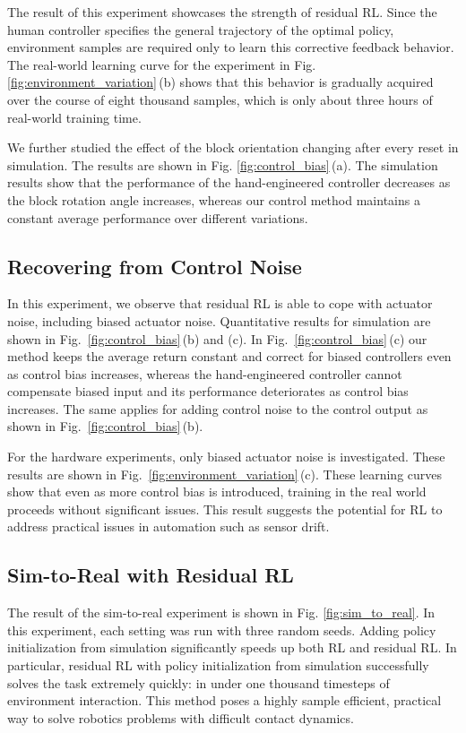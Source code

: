 The result of this experiment showcases the strength of residual RL. Since the human controller specifies the general trajectory of the optimal policy, environment samples are required only to learn this corrective feedback behavior. The real-world learning curve for the experiment in Fig. \ref{fig:environment_variation}\,(b) shows that this behavior is gradually acquired over the course of eight thousand samples, which is only about three hours of real-world training time.

We further studied the effect of the block orientation changing after every reset in simulation. The results are shown in Fig. \ref{fig:control_bias}\,(a). 
The simulation results show that the performance of the hand-engineered controller decreases as the block rotation angle increases, whereas our control method maintains a constant average performance over different variations. 

\subsection{Recovering from Control Noise}

In this experiment, we observe that residual RL is able to cope with actuator noise, including biased actuator noise.
Quantitative results for simulation are shown in  Fig.~\ref{fig:control_bias}\,(b) and (c). In Fig.~\ref{fig:control_bias}\,(c) our method keeps the average return constant and correct for biased controllers even as control bias increases, whereas the hand-engineered controller cannot compensate biased input and its performance deteriorates as control bias increases.
The same applies for adding control noise to the control output as shown in Fig.~\ref{fig:control_bias}\,(b).

For the hardware experiments, only biased actuator noise is investigated. These results are shown in Fig.~\ref{fig:environment_variation}\,(c). These learning curves show that even as more control bias is introduced, training in the real world proceeds without significant issues. This result suggests the potential for RL to address practical issues in automation such as sensor drift.

\subsection{Sim-to-Real with Residual RL}

The result of the sim-to-real experiment is shown in Fig. \ref{fig:sim_to_real}. In this experiment, each setting was run with three random seeds. Adding policy initialization from simulation significantly speeds up both RL and residual RL. In particular, residual RL with policy initialization from simulation successfully solves the task extremely quickly: in under one thousand timesteps of environment interaction. This method poses a highly sample efficient, practical way to solve robotics problems with  difficult contact dynamics.

